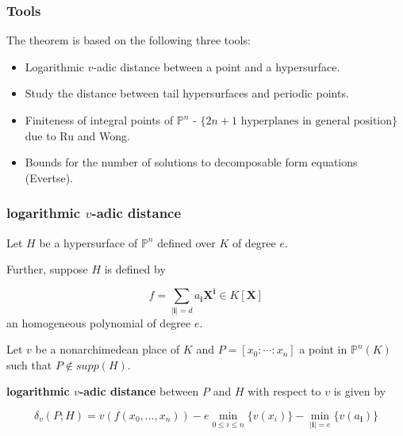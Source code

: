 \documentclass{beamer}
\def\PP{{\mathbb P}}
\theoremstyle{thmstyle}
\theoremstyle{thmstyle}
\theoremstyle{mystyle}
\theoremstyle{qstnstyle}
\begin{document}
\begin{frame}
\frametitle{Tools}
The theorem is based on the following three tools:
\begin{itemize}
\item Logarithmic $v$-adic distance between a point and a hypersurface.




\item Study the distance between tail hypersurfaces and periodic points.



\item Finiteness of integral points of $\PP^n$ - $\{2n+1 \mbox{ hyperplanes in general position}\}$ due to Ru and Wong.





\item Bounds for the number of solutions to decomposable form equations (Evertse).
\end{itemize}
\end{frame}





\begin{frame}
\frametitle{logarithmic $v$-adic distance}
Let $H$ be a hypersurface of $\PP^n$ defined over $K$ of degree $e$.

  Further, suppose $H$ is defined by 

$$f=\displaystyle\sum_{|\textbf{i}|= d} a_{\textbf{i}}\textbf{X}^{\textbf{i}} \in K[\textbf{X}] $$ an homogeneous polynomial  of degree $e$. 

  Let $v$ be a nonarchimedean place of $K$   and $P =[x_0:\cdots : x_n]$ a point in $\PP^n(K)$   such that $P\notin supp(H) $. 

\textbf{logarithmic $v$-adic distance} between $P$ and $H$ with respect to $v$ is given by

$$\delta_{v}(P;H)=v(f(x_0,\ldots,x_n))-e\min_{0\leq i\leq n}\{ v(x_i)  \}-\min_{|\textbf{i}|=e}\{  v(a_{\textbf{i}})  \}$$
\end{frame}
\end{document}
